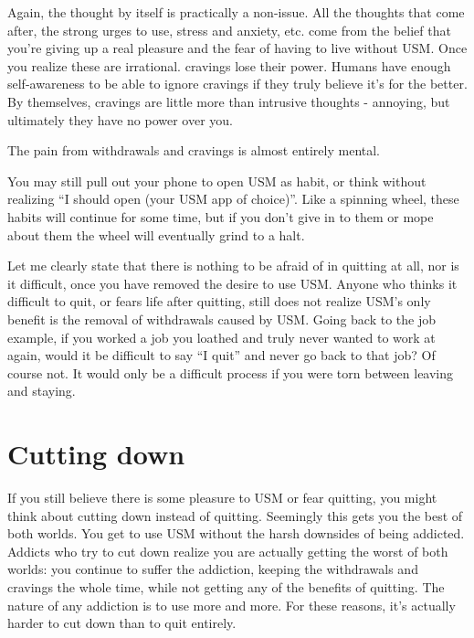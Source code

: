 \documentclass[
  openany]{book}
\newenvironment{rmdnote}{
\color{blue}
\begin{framed}}{\end{framed}}
\begin{document}
Again, the thought by itself is practically a non-issue. All the thoughts that come after, the strong urges to use, stress and anxiety, etc. come from the belief that you're giving up a real pleasure and the fear of having to live without USM. Once you realize these are irrational. cravings lose their power. Humans have enough self-awareness to be able to ignore cravings if they truly believe it's for the better. By themselves, cravings are little more than intrusive thoughts - annoying, but ultimately they have no power over you.

\begin{rmdnote}
The pain from withdrawals and cravings is almost entirely mental.

\end{rmdnote}

You may still pull out your phone to open USM as habit, or think without realizing ``I should open (your USM app of choice)''. Like a spinning wheel, these habits will continue for some time, but if you don't give in to them or mope about them the wheel will eventually grind to a halt.

Let me clearly state that there is nothing to be afraid of in quitting at all, nor is it difficult, once you have removed the desire to use USM. Anyone who thinks it difficult to quit, or fears life after quitting, still does not realize USM's only benefit is the removal of withdrawals caused by USM. Going back to the job example, if you worked a job you loathed and truly never wanted to work at again, would it be difficult to say ``I quit'' and never go back to that job? Of course not. It would only be a difficult process if you were torn between leaving and staying.

\section{Cutting down}\label{cutting-down}

If you still believe there is some pleasure to USM or fear quitting, you might think about cutting down instead of quitting. Seemingly this gets you the best of both worlds. You get to use USM without the harsh downsides of being addicted. Addicts who try to cut down realize you are actually getting the worst of both worlds: you continue to suffer the addiction, keeping the withdrawals and cravings the whole time, while not getting any of the benefits of quitting. The nature of any addiction is to use more and more. For these reasons, it's actually harder to cut down than to quit entirely.
\end{document}
